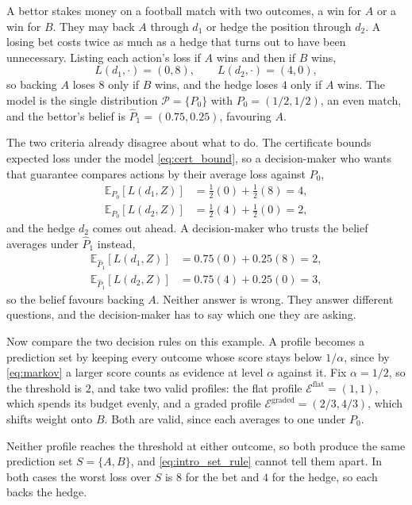 A bettor stakes money on a football match with two outcomes, a win for $A$ or
a win for $B$. They may back $A$ through $d_1$ or hedge the position through
$d_2$. A losing bet costs twice as much as a hedge that turns out to have been
unnecessary. Listing each action's loss if $A$ wins and then if $B$ wins,
\begin{equation}
  L(d_1,\cdot)=(0,8),\qquad L(d_2,\cdot)=(4,0),
  \label{eq:two_loss}
\end{equation}
so backing $A$ loses $8$ only if $B$ wins, and the hedge loses $4$ only if $A$
wins. The model is the single distribution $\mathcal P=\{P_0\}$ with
$P_0=(1/2,1/2)$, an even match, and the bettor's belief is
$\widehat P_1=(0.75,0.25)$, favouring $A$.

The two criteria already disagree about what to do. The certificate bounds
expected loss under the model \eqref{eq:cert_bound}, so a decision-maker who
wants that guarantee compares actions by their average loss against $P_0$,
\[
\begin{aligned}
\mathbb E_{P_0}[L(d_1,Z)]&=\tfrac12(0)+\tfrac12(8)=4,\\
\mathbb E_{P_0}[L(d_2,Z)]&=\tfrac12(4)+\tfrac12(0)=2,
\end{aligned}
\]
and the hedge $d_2$ comes out ahead. A decision-maker who trusts the belief
averages under $\widehat P_1$ instead,
\[
\begin{aligned}
\mathbb E_{\widehat P_1}[L(d_1,Z)]&=0.75(0)+0.25(8)=2,\\
\mathbb E_{\widehat P_1}[L(d_2,Z)]&=0.75(4)+0.25(0)=3,
\end{aligned}
\]
so the belief favours backing $A$. Neither answer is wrong. They answer
different questions, and the decision-maker has to say which one they are
asking.

Now compare the two decision rules on this example. A profile becomes a
prediction set by keeping every outcome whose score stays below $1/\alpha$,
since by \eqref{eq:markov} a larger score counts as evidence at level $\alpha$
against it. Fix $\alpha=1/2$, so the threshold is $2$, and take two valid
profiles: the
flat profile $\mathcal E^{\mathrm{flat}}=(1,1)$, which spends its budget
evenly, and a graded profile $\mathcal E^{\mathrm{graded}}=(2/3,4/3)$, which
shifts weight onto $B$. Both are valid, since each averages to one under
$P_0$.

Neither profile reaches the threshold at either outcome, so both produce the
same prediction set $S=\{A,B\}$, and \eqref{eq:intro_set_rule} cannot tell them apart.
In both cases the worst loss over $S$ is $8$ for the bet and $4$ for the
hedge, so each backs the hedge.

